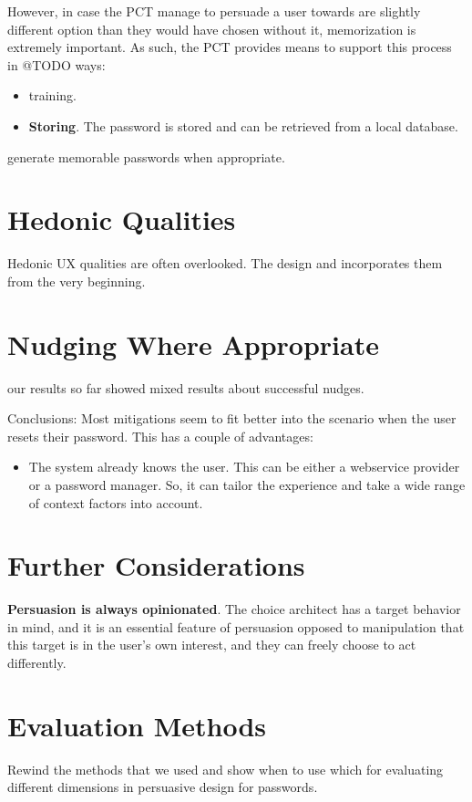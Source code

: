 However, in case the PCT manage to persuade a user towards are slightly different option than they would have chosen without it, memorization is extremely important. As such, the PCT provides means to support this process in @TODO ways:
\begin{itemize}
\item training. 
\item \textbf{Storing}. The password is stored and can be retrieved from a local database. 
\end{itemize}

generate memorable passwords when appropriate. 

\section{Hedonic Qualities}
Hedonic UX qualities are often overlooked. The design and incorporates them from the very beginning. 

\section{Nudging Where Appropriate}
our results so far showed mixed results about successful nudges. 


Conclusions: Most mitigations seem to fit better into the scenario when the user resets their password. This has a couple of advantages:
\begin{itemize}
	\item The system already knows the user. This can be either a webservice provider or a password manager. So, it can tailor the experience and take a wide range of context factors into account. 
\end{itemize}


\section{Further Considerations}

\textbf{Persuasion is always opinionated}. The choice architect has a target behavior in mind, and it is an essential feature of persuasion opposed to manipulation that this target is in the user's own interest, and they can freely choose to act differently. 


\section{Evaluation Methods}
Rewind the methods that we used and show when to use which for evaluating different dimensions in persuasive design for passwords. 


